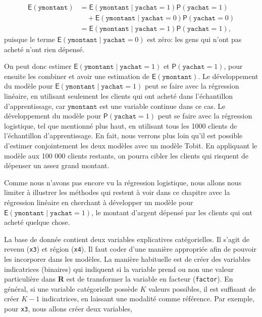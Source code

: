 \documentclass[
  11pt,
  letterpaper,
]{scrbook}
\theoremstyle{definition}
\theoremstyle{remark}
\begin{document}
\begin{align*}
\mathsf{E}(\texttt{ymontant}) &= \mathsf{E}(\texttt{ymontant} \mid \texttt{yachat}=1) \mathsf{P}(\texttt{yachat}=1) \\& \quad + 
\mathsf{E}(\texttt{ymontant} \mid \texttt{yachat}=0) \mathsf{P}(\texttt{yachat}=0) \\
 &= \mathsf{E}(\texttt{ymontant} \mid \texttt{yachat}=1) \mathsf{P}(\texttt{yachat}=1),
\end{align*} puisque le terme
\(\mathsf{E}(\texttt{ymontant} \mid \texttt{yachat}=0)\) est zéro: les
gens qui n'ont pas acheté n'ont rien dépensé.

On peut donc estimer
\(\mathsf{E}(\texttt{ymontant} \mid \texttt{yachat}=1)\) et
\(\mathsf{P}(\texttt{yachat}=1)\), pour ensuite les combiner et avoir
une estimation de \(\mathsf{E}(\texttt{ymontant})\). Le développement du
modèle pour \(\mathsf{E}(\texttt{ymontant} \mid \texttt{yachat}=1)\)
peut se faire avec la régression linéaire, en utilisant seulement les
clients qui ont acheté dans l'échantillon d'apprentissage, car
\(\texttt{ymontant}\) est une variable continue dans ce cas. Le
développement du modèle pour \(\mathsf{P}(\texttt{yachat}=1)\) peut se
faire avec la régression logistique, tel que mentionné plus haut, en
utilisant tous les 1000 clients de l'échantillon d'apprentissage. En
fait, nous verrons plus loin qu'il est possible d'estimer conjointement
les deux modèles avec un modèle Tobit. En appliquant le modèle aux 100
000 clients restants, on pourra cibler les clients qui risquent de
dépenser un assez grand montant.

Comme nous n'avons pas encore vu la régression logistique, nous allons
nous limiter à illustrer les méthodes qui restent à voir dans ce
chapitre avec la régression linéaire en cherchant à développer un modèle
pour \(\mathsf{E}(\texttt{ymontant} \mid \texttt{yachat}=1)\), le
montant d'argent dépensé par les clients qui ont acheté quelque chose.

La base de donnée contient deux variables explicatives catégorielles. Il
s'agit de revenu (\texttt{x3}) et région (\texttt{x4}). Il faut coder
d'une manière appropriée afin de pouvoir les incorporer dans les
modèles. La manière habituelle est de créer des variables indicatrices
(binaires) qui indiquent si la variable prend ou non une valeur
particulière dans \textbf{R} est de transformer la variable en facteur
(\texttt{factor}). En général, si une variable catégorielle possède
\(K\) valeurs possibles, il est suffisant de créer \(K-1\) indicatrices,
en laissant une modalité comme référence. Par exemple, pour \texttt{x3},
nous allons créer deux variables,
\end{document}
